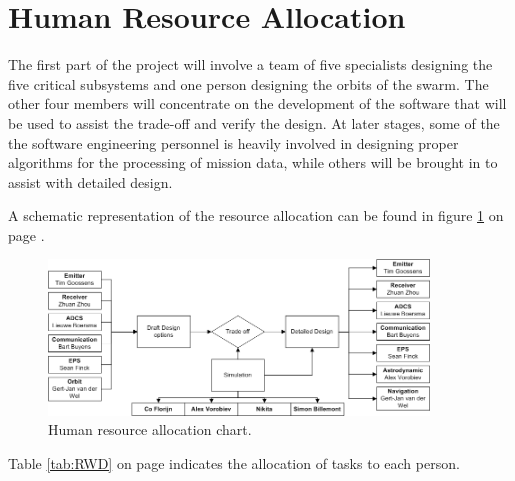 \section{Human Resource Allocation}
\label{DDHR}
The first part of the project will involve a team of five specialists designing the five critical subsystems and one person designing the orbits of the swarm. The other four members will concentrate on the development of the software that will be used to assist the trade-off and verify the design. At later stages, some of the the software engineering personnel is heavily involved in designing proper algorithms for the processing of mission data, while others will be brought in to assist with detailed design. 

A schematic representation of the resource allocation can be found in figure \ref{fig:DDBBHR} on page \pageref{fig:DDBBHR}.

\begin{figure}[h!]
\begin{center}
\includegraphics[width=0.9\textwidth]{chapters/img/DDBBHR.jpg}
\end{center}
\caption{Human resource allocation chart.}
\label{fig:DDBBHR}
\end{figure}

Table \ref{tab:RWD} on page \pageref{tab:RWD} indicates the allocation of tasks to each person.

